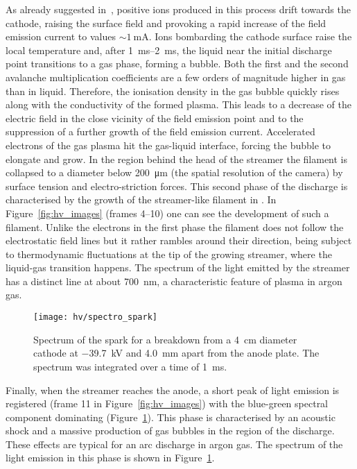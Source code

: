 As already suggested in~\cite{breakdown_14}, positive ions produced in this process drift towards the cathode, raising the surface field and provoking a rapid increase of the field emission current to values $\sim{\SI{1}{\milli\ampere}}$.
Ions bombarding the cathode surface raise the local temperature and, after \SIrange{1}{2}{\milli\second}, the liquid near the initial discharge point transitions to a gas phase, forming a bubble.
Both the first and the second avalanche multiplication coefficients are a few orders of magnitude higher in gas than in liquid.
Therefore, the ionisation density in the gas bubble quickly rises along with the conductivity of the formed plasma.
This leads to a decrease of the electric field in the close vicinity of the field emission point and to the suppression of a further growth of the field emission current.
Accelerated electrons of the gas plasma hit the gas-liquid interface, forcing the bubble to elongate and grow.
In the region behind the head of the streamer the filament is collapsed to a diameter below \SI{200}{\micro\metre} (the spatial resolution of the camera) by surface tension and electro-striction forces.
This second phase of the discharge is characterised by the growth of the streamer-like filament in \lar{}.
In Figure~\ref{fig:hv_images} (frames \numrange{4}{10}) one can see the development of such a filament.
Unlike the electrons in the first phase the filament does not follow the electrostatic field lines but it rather rambles around their direction, being subject to thermodynamic fluctuations at the tip of the growing streamer, where the liquid-gas transition happens.
The spectrum of the light emitted by the streamer has a distinct line at about \SI{700}{\nano\metre}, a characteristic feature of plasma in argon gas.

\begin{figure}[htb]
	\centering
	\texttt{[image: hv/spectro\_spark]}
	\caption[ test spark spectrum]{%
		Spectrum of the spark for a breakdown from a \SI{4}{\centi\metre} diameter cathode at \SI{-39.7}{\kilo\volt} and \SI{4.0}{\milli\metre} apart from the anode plate.
		The spectrum was integrated over a time of \SI{1}{\milli\second}.
	}
	\label{fig:hv_spectro_spark}
\end{figure}

Finally, when the streamer reaches the anode, a short peak of light emission is registered (frame \num{11} in Figure~\ref{fig:hv_images}) with the blue-green spectral component dominating (Figure~\ref{fig:hv_spectro_spark}).
This phase is characterised by an acoustic shock and a massive production of gas bubbles in the region of the discharge.
These effects are typical for an arc discharge in argon gas.
The spectrum of the light emission in this phase  is shown in Figure~\ref{fig:hv_spectro_spark}. 

